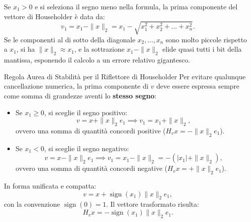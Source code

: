 Se $x_1 > 0$ e si seleziona il segno meno nella formula, la prima componente del vettore di Householder \`e data da:
\begin{equation}
    v_1 = x_1 - \|x\|_2 = x_1 - \sqrt{x_1^2 + x_2^2 + \dots + x_n^2}.
\end{equation}
Se le componenti al di sotto della diagonale $x_2, \dots, x_n$ sono molto piccole rispetto a $x_1$, si ha $\|x\|_2 \approx x_1$, e la sottrazione $x_1 - \|x\|_2$ elide quasi tutti i bit della mantissa, esponendo il calcolo a un errore relativo gigantesco.

\begin{noteblock}{Regola Aurea di Stabilit\`a per il Riflettore di Householder}
Per evitare qualunque cancellazione numerica, la prima componente di $v$ deve essere espressa sempre come somma di grandezze aventi lo \textbf{stesso segno}:
\begin{itemize}
    \item Se $x_1 \ge 0$, si sceglie il segno positivo:
    \begin{equation}
        v = x + \|x\|_2 e_1 \implies v_1 = x_1 + \|x\|_2,
    \end{equation}
    ovvero una somma di quantit\`a concordi positive ($H_v x = -\|x\|_2 e_1$).
    \item Se $x_1 < 0$, si sceglie il segno negativo:
    \begin{equation}
        v = x - \|x\|_2 e_1 \implies v_1 = x_1 - \|x\|_2 = -(|x_1| + \|x\|_2),
    \end{equation}
    ovvero una somma di quantit\`a concordi negative ($H_v x = +\|x\|_2 e_1$).
\end{itemize}
In forma unificata e compatta:
\begin{equation}
    v = x + \operatorname{sign}(x_1) \|x\|_2 e_1,
    \label{eq:criterio-stabile-householder}
\end{equation}
con la convenzione $\operatorname{sign}(0) = 1$. Il vettore trasformato risulta:
\begin{equation}
    H_v x = -\operatorname{sign}(x_1) \|x\|_2 e_1.
\end{equation}
\end{noteblock}

